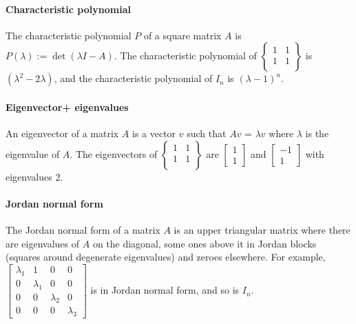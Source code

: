 \documentclass[]{article}
\begin{document}
\paragraph{Characteristic polynomial} The characteristic polynomial $P$ of a square matrix $A$ is $P(\lambda) := \det(\lambda I - A )$. The characteristic polynomial of $
\begin{Bmatrix}
	1 & 1 \\
	1 & 1 \\
\end{Bmatrix}
$
is $(\lambda^2 - 2\lambda)$, and the characteristic polynomial of $I_n$ is $(\lambda - 1)^n$. 
\paragraph{Eigenvector+ eigenvalues} An eigenvector of a matrix $A$ is a vector $v$ such that $A v$ = $\lambda v$ where $\lambda$ is the eigenvalue of $A$. The eigenvectors of 
$
\begin{Bmatrix}
	1 & 1 \\
	1 & 1 \\
\end{Bmatrix}
$
are $
\begin{bmatrix}
	1\\
	1
\end{bmatrix}
$
and
$\begin{bmatrix}
	-1\\
	1
\end{bmatrix}
$
with eigenvalues 2. 
\paragraph{Jordan normal form} The Jordan normal form of a matrix $A$ is an upper triangular matrix where there are eigenvalues of $A$ on the diagonal, some ones above it in Jordan blocks (squares around degenerate eigenvalues) and zeroes elsewhere.
For example, 
$
\begin{bmatrix}
	\lambda_1 & 1         & 0         & 0         \\
	0         & \lambda_1 & 0         & 0         \\
	0         & 0         & \lambda_2 & 0         \\
	0         & 0         & 0         & \lambda_3
\end{bmatrix}
$
is in Jordan normal form, and so is $I_n$. 
\end{document}
